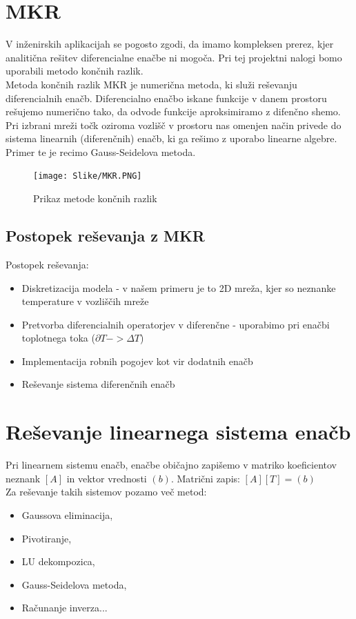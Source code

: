 \documentclass[a4paper,12pt]{article}
\begin{document}
\section{MKR}

V inženirskih aplikacijah se pogosto zgodi, da imamo kompleksen prerez, kjer analitična rešitev diferencialne enačbe ni mogoča. Pri tej projektni nalogi bomo uporabili metodo končnih razlik.\\

Metoda končnih razlik MKR je numerična metoda, ki služi reševanju diferencialnih enačb. Diferencialno enačbo iskane
funkcije v danem prostoru rešujemo numerično tako, da odvode funkcije aproksimiramo z difenčno shemo. 
Pri izbrani mreži točk oziroma vozlišč v prostoru nas omenjen način privede do sistema linearnih (diferenčnih) enačb, ki 
ga rešimo z uporabo linearne algebre. Primer te je recimo Gauss-Seidelova metoda.

\begin{figure}[h]
    \centering
    \texttt{[image: Slike/MKR.PNG]}
    \caption{Prikaz metode končnih razlik}
    \label{fig:MKR}
\end{figure}

\subsection{Postopek reševanja z MKR}

Postopek reševanja:
\begin{itemize}
    \item Diskretizacija modela - v našem primeru je to 2D mreža, kjer so neznanke temperature v vozliščih mreže
    \item Pretvorba diferencialnih operatorjev v diferenčne - uporabimo pri enačbi toplotnega toka ($\partial T -> \Delta T$)
    \item Implementacija robnih pogojev kot vir dodatnih enačb
    \item Reševanje sistema diferenčnih enačb
\end{itemize}

\section{Reševanje linearnega sistema enačb}

Pri linearnem sistemu enačb, enačbe običajno zapišemo v matriko koeficientov neznank $[A]$ in vektor vrednosti $(b)$. Matrični zapis: $[A][T]=(b)$\\
Za reševanje takih sistemov pozamo več metod:
\begin{itemize}
    \item Gaussova eliminacija,
    \item Pivotiranje,
    \item LU dekompozica,
    \item Gauss-Seidelova metoda,
    \item Računanje inverza...\medskip
\end{itemize}
\end{document}
